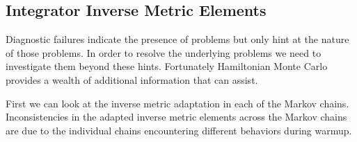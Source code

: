 \documentclass[
  letterpaper,
  DIV=11,
  numbers=noendperiod]{scrartcl}
\begin{document}
\hypertarget{integrator-inverse-metric-elements}{%
\subsection{Integrator Inverse Metric
Elements}\label{integrator-inverse-metric-elements}}

Diagnostic failures indicate the presence of problems but only hint at
the nature of those problems. In order to resolve the underlying
problems we need to investigate them beyond these hints. Fortunately
Hamiltonian Monte Carlo provides a wealth of additional information that
can assist.

First we can look at the inverse metric adaptation in each of the Markov
chains. Inconsistencies in the adapted inverse metric elements across
the Markov chains are due to the individual chains encountering
different behaviors during warmup.
\end{document}
